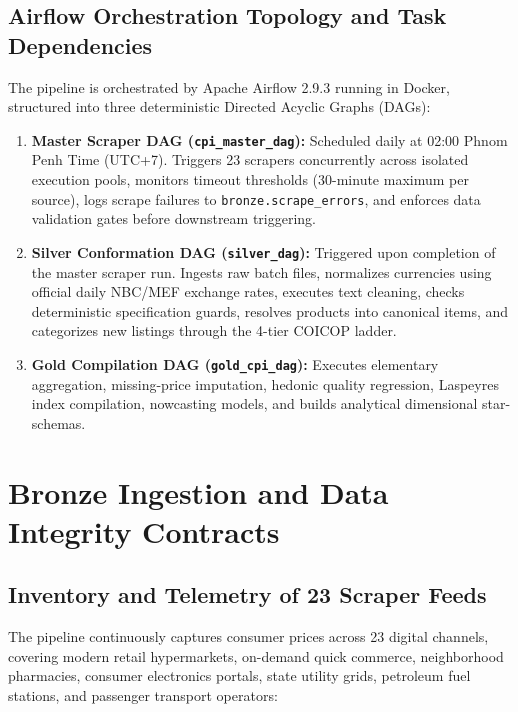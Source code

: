 \documentclass[11pt,a4paper]{article}
\begin{document}
\subsection{Airflow Orchestration Topology and Task Dependencies}
The pipeline is orchestrated by Apache Airflow 2.9.3 running in Docker, structured into three deterministic Directed Acyclic Graphs (DAGs):
\begin{enumerate}
    \item \textbf{Master Scraper DAG (\texttt{cpi\_master\_dag}):}
        Scheduled daily at 02:00 Phnom Penh Time (UTC+7). Triggers 23 scrapers concurrently across isolated execution pools, monitors timeout thresholds (30-minute maximum per source), logs scrape failures to \texttt{bronze.scrape\_errors}, and enforces data validation gates before downstream triggering.
    \item \textbf{Silver Conformation DAG (\texttt{silver\_dag}):}
        Triggered upon completion of the master scraper run. Ingests raw batch files, normalizes currencies using official daily NBC/MEF exchange rates, executes text cleaning, checks deterministic specification guards, resolves products into canonical items, and categorizes new listings through the 4-tier COICOP ladder.
    \item \textbf{Gold Compilation DAG (\texttt{gold\_cpi\_dag}):}
        Executes elementary aggregation, missing-price imputation, hedonic quality regression, Laspeyres index compilation, nowcasting models, and builds analytical dimensional star-schemas.
\end{enumerate}

\newpage

\section{Bronze Ingestion and Data Integrity Contracts}

\subsection{Inventory and Telemetry of 23 Scraper Feeds}
The pipeline continuously captures consumer prices across 23 digital channels, covering modern retail hypermarkets, on-demand quick commerce, neighborhood pharmacies, consumer electronics portals, state utility grids, petroleum fuel stations, and passenger transport operators:
\end{document}
